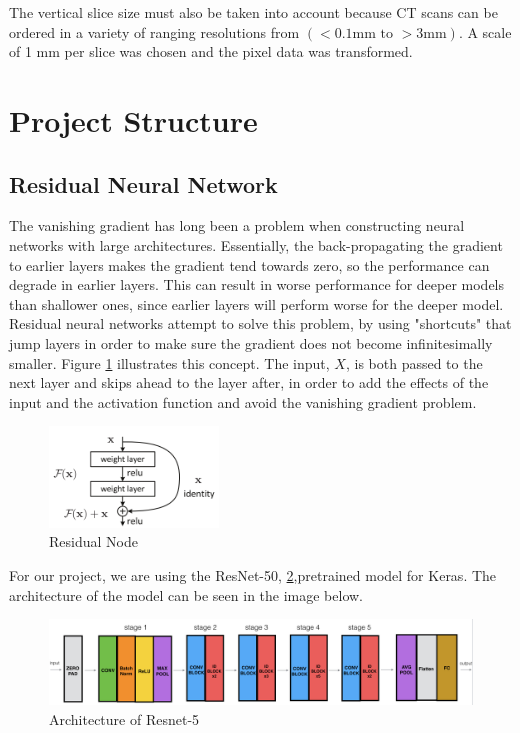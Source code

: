 \documentclass[10pt,twocolumn,letterpaper]{article}
\begin{document}
         The vertical slice size must also be taken into account because CT scans can be ordered in a variety of
         ranging resolutions from $(<0.1\text{mm to } >3 \text{mm})$. A scale of 1 mm per slice was chosen and the
         pixel data was transformed.

\section{Project Structure} \label{sec:struct}

   \subsection{Residual Neural Network} \label{sec:struct-cnn}
        The vanishing gradient has long been a problem when constructing neural networks with large architectures. Essentially, the back-propagating the gradient to earlier layers makes the gradient tend towards zero, so the performance can degrade in earlier layers. This can result in worse performance for deeper models than shallower ones, since earlier layers will perform worse for the deeper model. Residual neural networks attempt to solve this problem, by using "shortcuts" that jump layers in order to make sure the gradient does not become infinitesimally smaller. Figure \ref{fig:struct-cnn-residual} illustrates this concept. The input, $X$, is both passed to the next layer and skips ahead to the layer after, in order to add the effects of the input and the activation function and avoid the vanishing gradient problem.

        \begin{figure}[h]
            \centering
            \includegraphics[width=0.4\textwidth]{./images/residual.png}
            \caption{Residual Node}
            \label{fig:struct-cnn-residual}
        \end{figure}

        For our project, we are using the ResNet-50, \ref{fig:struct-cnn-resnet},pretrained model for Keras. The architecture of the model can be seen in the image below.

        \begin{figure}
            \begin{center}
                \includegraphics[width=\textwidth]{./images/Resnet-50.png}
            \end{center}
            \caption{Architecture of Resnet-5}
            \label{fig:struct-cnn-resnet}
        \end{figure}
\end{document}
